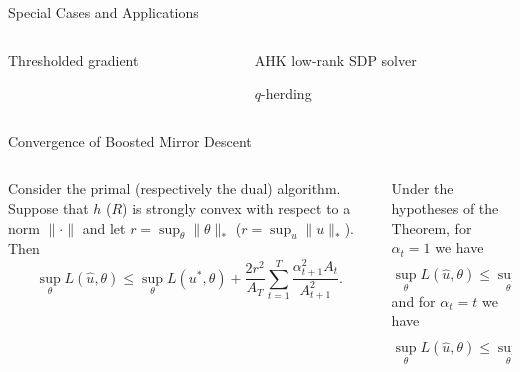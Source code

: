 \documentclass[final]{beamer}
\begin{document}
\begin{frame}{}
\begin{columns}
\begin{column}{0.48\linewidth}
\begin{block}{\large Special Cases and Applications}
\begin{columns}[t]
\begin{column}{0.45\linewidth}
\begin{block}{Thresholded gradient}
\end{block}

\end{column}
\begin{column}{0.45\linewidth}
\begin{block}{AHK low-rank SDP solver}
\end{block}

\begin{block}{$q$-herding}
\end{block}

\end{column}
\end{columns}
\end{block}

\begin{block}{\large Convergence of Boosted Mirror Descent}
\begin{columns}[t]
\begin{column}{0.45\linewidth}
\begin{theorem}
Consider the primal (respectively the dual) algorithm. Suppose that $h$ ($R$) is strongly convex with respect to a norm $\|\cdot\|$ 
and let $r = \sup_{\theta} \|\theta\|_{*}$ ($r = \sup_{u} \|u\|_{*}$). Then
\[ \sup_{\theta} L(\hat{u}, \theta) \leq \sup_{\theta} L(u^*, \theta) + \frac{2r^2}{A_T} \sum_{t=1}^T \frac{\alpha_{t+1}^2A_t}{A_{t+1}^2}. \]
\end{theorem}
\end{column}
\begin{column}{0.45\linewidth}
\begin{corollary} 
Under the hypotheses of the Theorem, for $\alpha_{t} = 1$ we have
\[ \sup_{\theta} L(\hat{u}, \theta) \leq \sup_{\theta} L(u^*, \theta) + \frac{2r^2 (\log (T) + 1)}{T}. \]
and for $\alpha_t = t$ we have
\[ \sup_{\theta} L(\hat{u}, \theta) \leq \sup_{\theta} L(u^*, \theta) + \frac{8r^2}{T}. \]
\end{corollary}
\end{column}
\end{columns}
\end{block}


\end{column}
\end{columns}
\end{frame}
\end{document}
